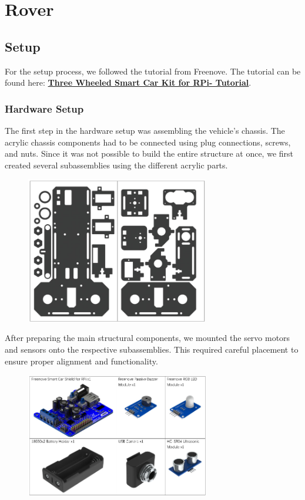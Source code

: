 \section{Rover}



\subsection{Setup}
For the setup process, we followed the tutorial from Freenove.
The tutorial can be found here:
\href{https://github.com/Freenove/Freenove_Three-wheeled_Smart_Car_Kit_for_Raspberry_Pi/blob/master/Tutorial.pdf}{\textbf{Three Wheeled Smart Car Kit for RPi- Tutorial}}.

\subsubsection{Hardware Setup}

The first step in the hardware setup was assembling the vehicle’s chassis. The acrylic chassis components had to be connected using plug connections, screws, and nuts. Since it was not possible to build the entire structure at once, we first created several subassemblies using the different acrylic parts.

\begin{figure}[H]
    \includegraphics[width=8cm]{img/acrylic_sheets}
\end{figure}

After preparing the main structural components, we mounted the servo motors and sensors onto the respective subassemblies. This required careful placement to ensure proper alignment and functionality.

\begin{figure}[H]
    \includegraphics[width=8cm]{img/shield_and_sensors}
\end{figure}

